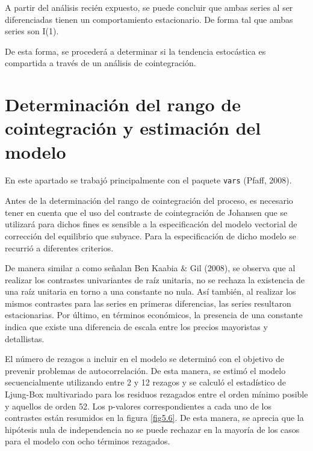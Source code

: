 \documentclass[12pt, twoside]{book}\usepackage[]{graphicx}\usepackage[]{color}
\numberwithin{equation}{section}
\numberwithin{theorem}{section}
\numberwithin{teorema}{section}
\numberwithin{defi}{section}
\numberwithin{prop}{section}
\numberwithin{defi}{section}
\theoremstyle{plain}
\begin{document}
A partir del análisis recién expuesto, se puede concluir que ambas series al ser diferenciadas tienen un comportamiento estacionario. De forma tal que ambas series son I(1).

De esta forma, se procederá a determinar si la tendencia estocástica es compartida a través de un análisis de cointegración. 

\section{Determinación del rango de cointegración y estimación del modelo}

En este apartado se trabajó principalmente con el paquete \texttt{vars} (Pfaff, 2008). 



Antes de la determinación del rango de cointegración del proceso, es necesario tener en cuenta que el uso del contraste de cointegración de Johansen que se utilizará para dichos fines es sensible a la especificación del modelo vectorial de corrección del equilibrio que subyace. Para la especificación de dicho modelo se recurrió a diferentes criterios. 

De manera similar a como señalan Ben Kaabia \& Gil (2008), se observa que al realizar los contrastes univariantes de raíz unitaria, no se rechaza la existencia de una raíz unitaria en torno a una constante no nula. Así también, al realizar los mismos contrastes para las series en primeras diferencias, las series resultaron estacionarias. Por último, en términos económicos, la presencia de una constante indica que existe una diferencia de escala entre los precios mayoristas y detallistas. 

El número de rezagos a incluir en el modelo se determinó con el objetivo de prevenir problemas de autocorrelación. De esta manera, se estimó el modelo secuencialmente utilizando entre 2 y  12 rezagos y se calculó el estadístico de Ljung-Box multivariado para los residuos rezagados entre el orden mínimo posible y aquellos de orden 52. Los p-valores correspondientes a cada uno de los contrastes están resumidos en la figura \ref{fig5.6}. De esta manera, se aprecia que la hipótesis nula de independencia no se puede rechazar en la mayoría de los casos para el modelo con ocho términos rezagados. 
\end{document}
